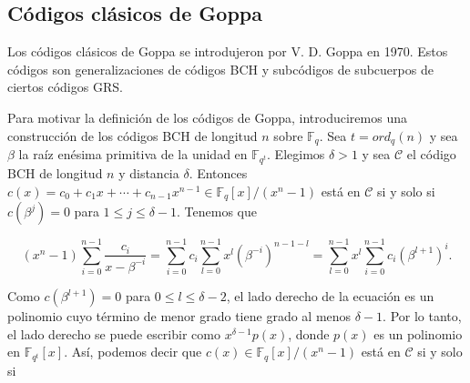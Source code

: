 \begin{comment}
A continuación, introduciremos la definición de los códigos Reed-Solomon generalizados.

Para $k \geq 0$, $\mathcal{P}_k$ denota el conjunto de polinomios de grado menor que $k$, incluyendo el polinomio nulo, en $\mathbb{F}_q[x]$. Sea $n$ un número entero tal que $1 \leq n \leq q$, $\gamma = (\gamma _0,..., \gamma _{n-1})$ una n-tupla de elementos distintos de $\mathbb{F}_q$, y $\textbf{v} = (v_0,...,v_{n-1})$ una n-tupla de elementos no nulos de $\mathbb{F}_q$. Sea $k$ un número entero tal que $1 \leq k \leq n$. Entonces los códigos

$$GRS_k (\gamma, \textbf{v}) = \left\{ \left( v_0 f(\gamma_0), ..., v_{n-1}f(\gamma_{n-1}) \right) : f \in \mathcal{P}_k \right\}$$

son los códigos Reed-Solomon generalizados (códigos GRS).
\end{comment}

\subsection{Códigos clásicos de Goppa}

Los códigos clásicos de Goppa se introdujeron por V. D. Goppa en 1970. Estos códigos son generalizaciones de códigos BCH y subcódigos de subcuerpos de ciertos códigos GRS.

Para motivar la definición de los códigos de Goppa, introduciremos una construcción de los códigos BCH de longitud $n$ sobre $\mathbb{F}_q$. Sea $t = ord_q(n)$ y sea $\beta$ la raíz enésima primitiva de la unidad en $\mathbb{F}_{q^t}$. Elegimos $\delta > 1$ y sea $\mathcal{C}$ el código BCH de longitud $n$ y distancia $\delta$. Entonces $c(x) = c_0 + c_1x + \cdots + c_{n-1}x^{n-1} \in \mathbb{F}_q [x] / (x^n - 1)$ está en $\mathcal{C}$ si y solo si $c(\beta^j) = 0$ para $1 \leq j \leq \delta - 1$. Tenemos que 

$$(x^n - 1) \sum_{i=0}^{n-1} \frac{c_i}{x - \beta ^{-i}} = \sum_{i=0}^{n-1} c_i \sum_{l=0}^{n-1} x^l \left( \beta ^{-i} \right) ^{n-1-l} = \sum_{l=0}^{n-1} x^l \sum_{i=0}^{n-1} c_i \left( \beta^{l+1} \right) ^i.$$

Como $c(\beta^{l+1}) = 0$ para $0 \leq l \leq \delta - 2$, el lado derecho de la ecuación es un polinomio cuyo término de menor grado tiene grado al menos $\delta - 1$. Por lo tanto, el lado derecho se puede escribir como $x^{\delta - 1} p(x)$, donde $p(x)$ es un polinomio en $\mathbb{F}_{q^t}[x]$. Así, podemos decir que $c(x) \in \mathbb{F}_q[x] / (x^n - 1)$ está en $\mathcal{C}$ si y solo si 

